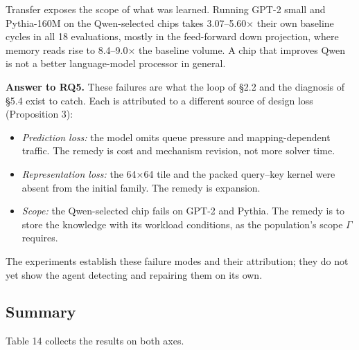 \documentclass[11pt]{article}
\providecommand{\tightlist}{\setlength{\itemsep}{0pt}\setlength{\parskip}{0pt}}
\begin{document}
Transfer exposes the scope of what was learned. Running GPT-2 small and Pythia-160M on the Qwen-selected chips takes 3.07--5.60\ensuremath{\times} their own baseline cycles in all 18 evaluations, mostly in the feed-forward down projection, where memory reads rise to 8.4--9.0\ensuremath{\times} the baseline volume. A chip that improves Qwen is not a better language-model processor in general.

\textbf{Answer to RQ5.} These failures are what the loop of §2.2 and the diagnosis of §5.4 exist to catch. Each is attributed to a different source of design loss (Proposition 3):

\begin{itemize}
\tightlist
\item
  \emph{Prediction loss:} the model omits queue pressure and mapping-dependent traffic. The remedy is cost and mechanism revision, not more solver time.
\item
  \emph{Representation loss:} the 64\ensuremath{\times}64 tile and the packed query--key kernel were absent from the initial family. The remedy is expansion.
\item
  \emph{Scope:} the Qwen-selected chip fails on GPT-2 and Pythia. The remedy is to store the knowledge with its workload conditions, as the population's scope \(\Gamma\) requires.
\end{itemize}

The experiments establish these failure modes and their attribution; they do not yet show the agent detecting and repairing them on its own.

\hypertarget{summary}{%
\subsection{Summary}\label{summary}}

Table 14 collects the results on both axes.
\end{document}
